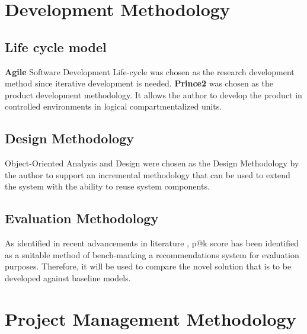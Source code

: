 \documentclass[a4paper, 12pt, oneside]{report}
\begin{document}
\section{Development Methodology}
\subsection{Life cycle model}
\textbf{Agile} Software Development Life-cycle was chosen as the research development method since iterative development is needed. \textbf{Prince2}  was chosen as the product development methodology. It allows the author to develop the product in controlled environments in logical compartmentalized units.


\subsection{Design Methodology}
Object-Oriented Analysis and Design were chosen as the Design Methodology by the author to support an incremental methodology that can be used to extend the system with the ability to reuse system components.

\subsection{Evaluation Methodology}
As identified in recent advancements in literature \autocite{larry_history_2019}, \gls{p@k} score has been identified as a suitable method of bench-marking a recommendations system for evaluation purposes. Therefore, it will be used to compare the novel solution that is to be developed against baseline models.

\section{Project Management Methodology}
\newpage
\end{document}
